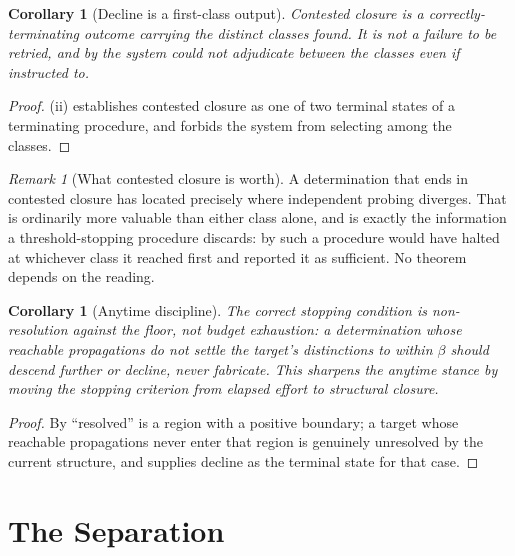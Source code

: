 \documentclass[11pt,twocolumn,a4paper]{article}
\theoremstyle{dirthm}
\newtheorem{corollary}[theorem]{Corollary}
\theoremstyle{definition}
\theoremstyle{remark}
\newtheorem{remark}[theorem]{Remark}
\newcommand{\flo}{\beta}
\begin{document}
\begin{corollary}[Decline is a first-class output]
\label{cor:decline-first-class}
Contested closure is a correctly-terminating outcome carrying the distinct
classes found. It is not a failure to be retried, and by 
the system could not adjudicate between the classes even if instructed to.
\end{corollary}

\begin{proof}
(ii) establishes contested closure as one of two terminal
states of a terminating procedure, and  forbids the
system from selecting among the classes.
\end{proof}

\begin{remark}[What contested closure is worth]
\label{rem:contested-value}
A determination that ends in contested closure has located precisely where
independent probing diverges. That is ordinarily more valuable than either
class alone, and is exactly the information a threshold-stopping procedure
discards: by  such a procedure would have halted
at whichever class it reached first and reported it as sufficient. No theorem
depends on the reading.
\end{remark}

\begin{corollary}[Anytime discipline]
\label{cor:anytime}
The correct stopping condition is non-resolution against the floor, not
budget exhaustion: a determination whose reachable propagations do not settle
the target's distinctions to within $\flo$ should descend further or decline,
never fabricate. This sharpens the anytime stance
\citep{dean1988,zilberstein1996} by moving the stopping criterion from
elapsed effort to structural closure.
\end{corollary}

\begin{proof}
By  ``resolved'' is a region with a positive boundary; a
target whose reachable propagations never enter that region is genuinely
unresolved by the current structure, and  supplies decline
as the terminal state for that case.
\end{proof}

\part{The Separation}
\label{part:separation}
\end{document}
